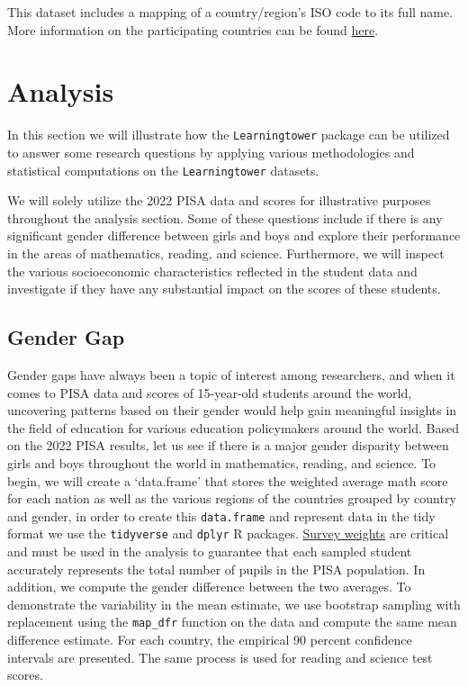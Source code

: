 \documentclass[
  11pt,
  a4paper,
]{article}
\begin{document}
This dataset includes a mapping of a country/region's ISO code to its
full name. More information on the participating countries can be found
\href{https://www.oecd.org/en/about/programmes/pisa/pisa-participants.html}{here}.

\section{Analysis}\label{analysis}

In this section we will illustrate how the \texttt{Learningtower}
package can be utilized to answer some research questions by applying
various methodologies and statistical computations on the
\texttt{Learningtower} datasets.

We will solely utilize the 2022 PISA data and scores for illustrative
purposes throughout the analysis section. Some of these questions
include if there is any significant gender difference between girls and
boys and explore their performance in the areas of mathematics, reading,
and science. Furthermore, we will inspect the various socioeconomic
characteristics reflected in the student data and investigate if they
have any substantial impact on the scores of these students.

\subsection{Gender Gap}\label{gender-gap}

Gender gaps have always been a topic of interest among researchers, and
when it comes to PISA data and scores of 15-year-old students around the
world, uncovering patterns based on their gender would help gain
meaningful insights in the field of education for various education
policymakers around the world. Based on the 2022 PISA results, let us
see if there is a major gender disparity between girls and boys
throughout the world in mathematics, reading, and science. To begin, we
will create a `data.frame' that stores the weighted average math score
for each nation as well as the various regions of the countries grouped
by country and gender, in order to create this \texttt{data.frame} and
represent data in the tidy format we use the \texttt{tidyverse}
\autocite{tidyverse} and \texttt{dplyr} \autocite{dplyr} R packages.
\href{https://www.oecd-ilibrary.org/education/pisa-2022-technical-report_01820d6d-en}{Survey
weights} are critical and must be used in the analysis to guarantee that
each sampled student accurately represents the total number of pupils in
the PISA population. In addition, we compute the gender difference
between the two averages. To demonstrate the variability in the mean
estimate, we use bootstrap sampling with replacement using the
\texttt{map\_dfr} function on the data and compute the same mean
difference estimate. For each country, the empirical 90 percent
confidence intervals are presented. The same process is used for reading
and science test scores.
\end{document}
